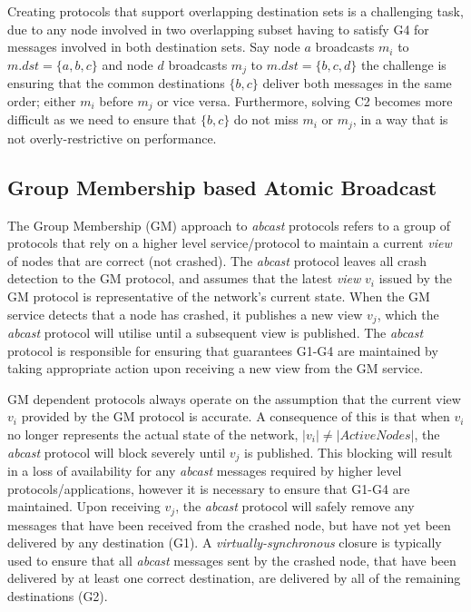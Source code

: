         Creating protocols that support overlapping destination sets is a challenging task, due to any node involved in two overlapping subset having to satisfy G4 for messages involved in both destination sets.  Say node $a$ broadcasts $m_i$ to $m.dst = \{a,b,c\}$ and node $d$ broadcasts $m_j$ to $m.dst = \{b,c,d\}$ the challenge is ensuring that the common destinations $\{b,c\}$ deliver both messages in the same order; either $m_i$ before $m_j$ or vice versa.  Furthermore, solving C2 becomes more difficult as we need to ensure that $\{b,c\}$ do not miss $m_i$ or $m_j$, in a way that is not overly-restrictive on performance.  
        
        
	\subsection{Group Membership based Atomic Broadcast}
	The Group Membership (GM) approach to \emph{abcast} protocols refers to a group of protocols that rely on a higher level service/protocol to maintain a current \emph{view} of nodes that are correct (not crashed).  The \emph{abcast} protocol leaves all crash detection to the GM protocol, and assumes that the latest \emph{view} $v_i$ issued by the GM protocol is representative of the network's current state.  When the GM service detects that a node has crashed, it publishes a new view $v_j$, which the \emph{abcast} protocol will utilise until a subsequent view is published.  The \emph{abcast} protocol is responsible for ensuring that guarantees G1-G4 are maintained by taking appropriate action upon receiving a new view from the GM service.  
	
	GM dependent protocols always operate on the assumption that the current view $v_i$ provided by the GM protocol is accurate.  A consequence of this is that when $v_i$ no longer represents the actual state of the network, $\left\vert v_i \right\vert \neq \left\vert ActiveNodes \right\vert$, the \emph{abcast} protocol will block severely until $v_j$ is published.  This blocking will result in a loss of availability for any \emph{abcast} messages required by higher level protocols/applications, however it is necessary to ensure that G1-G4 are maintained.  Upon receiving $v_j$, the \emph{abcast} protocol will safely remove any messages that have been received from the crashed node, but have not yet been delivered by any destination (G1).  A \emph{virtually-synchronous}\cite{Birman:1991:LCA:128738.128742} closure is typically used to ensure that all \emph{abcast} messages sent by the crashed node, that have been delivered by at least one correct destination, are delivered by all of the remaining destinations (G2).  

